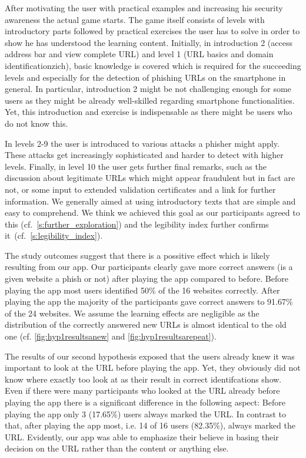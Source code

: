 After motivating the user with practical examples and increasing his security awareness the actual game starts.
The game itself consists of levels with introductory parts followed by practical exercises the user has to solve in order to show he has understood the learning content.
Initially, in introduction 2 (access address bar and view complete URL) and level 1 (URL basics and domain identificationzich), basic knowledge is covered which is required for the succeeding levels and especially for the detection of phishing URLs on the smartphone in general.
In particular, introduction 2 might be not challenging enough for some users as they might be already well-skilled regarding smartphone functionalities.
Yet, this introduction and exercise is indispensable as there might be users who do not know this.

In levels 2-9 the user is introduced to various attacks a phisher might apply.
These attacks get increasingly sophisticated and harder to detect with higher levels.
Finally, in level 10 the user gets further final remarks, such as the discussion about legitimate URLs which might appear fraudulent but in fact are not, or some input to extended validation certificates and a link for further information.
We generally aimed at using introductory texts that are simple and easy to comprehend.
We think we achieved this goal as our participants agreed to this (cf.~\autoref{s:further_exploration}) and the legibility index further confirms it~(cf.~\autoref{s:legibility_index}).

The study outcomes suggest that there is a possitive effect which is likely resulting from our app.
Our participants clearly gave more correct answers (is a given website a phish or not) after playing the app compared to before.
Before playing the app most users identified 50\% of the 16 websites correctly.
After playing the app the majority of the participants gave correct answers to 91.67\% of the 24 websites.
We assume the learning effects are negligible as the distribution of the correctly answered new URLs is almost identical to the old one (cf. \autoref{fig:hyp1resultsanew} and \autoref{fig:hyp1resultsarepeat}).

The results of our second hypothesis exposed that the users already knew it was important to look at the URL before playing the app.
Yet, they obviously did not know where exactly too look at as their result in correct identifcations show.
Even if there were many participants who looked at the URL already before playing the app there is a significant difference in the following aspect:
Before playing the app only 3 (17.65\%) users always marked the URL.
In contrast to that, after playing the app most, i.e. 14 of 16 users (82.35\%), always marked the URL.
Evidently, our app was able to emphasize their believe in basing their decision on the URL rather than the content or anything else.

